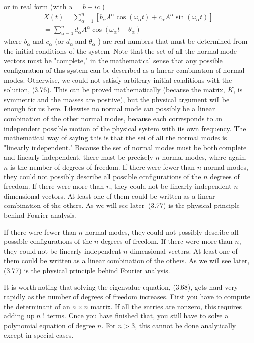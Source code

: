 \documentclass[main.tex]{subfiles}
\begin{document}
or in real form (with $w=b+i c$ )
$$
\begin{gathered}
X(t)=\sum_{\alpha=1}^n\left[b_\alpha A^\alpha \cos \left(\omega_\alpha t\right)+c_\alpha A^\alpha \sin \left(\omega_\alpha t\right)\right] \\
=\sum_{\alpha=1}^n d_\alpha A^\alpha \cos \left(\omega_\alpha t-\theta_\alpha\right)
\end{gathered}
$$
where $b_\alpha$ and $c_\alpha$ (or $d_\alpha$ and $\theta_\alpha$ ) are real numbers that must be determined from the initial conditions of the system. Note that the set of all the normal mode vectors must be "complete," in the mathematical sense that any possible configuration of this system can be described as a linear combination of normal modes. Otherwise, we could not satisfy arbitrary initial conditions with the solution, (3.76). This can be proved mathematically (because the matrix, $K$, is symmetric and the masses are positive), but the physical argument will be enough for us here. Likewise no normal mode can possibly be a linear combination of the other normal modes, because each corresponds to an independent possible motion of the physical system with its own frequency. The mathematical way of saying this is that the set of all the normal modes is "linearly independent."
Because the set of normal modes must be both complete and linearly independent, there must be precisely $n$ normal modes, where again, $n$ is the number of degrees of freedom.
If there were fewer than $n$ normal modes, they could not possibly describe all possible configurations of the $n$ degrees of freedom. If there were more than $n$, they could not be linearly independent $n$ dimensional vectors. At least one of them could be written as a linear combination of the others. As we will see later, (3.77) is the physical principle behind Fourier analysis.

If there were fewer than $n$ normal modes, they could not possibly describe all possible configurations of the $n$ degrees of freedom. If there were more than $n$, they could not be linearly independent $n$ dimensional vectors. At least one of them could be written as a linear combination of the others. As we will see later, (3.77) is the physical principle behind Fourier analysis.

It is worth noting that solving the eigenvalue equation, (3.68), gets hard very rapidly as the number of degrees of freedom increases. First you have to compute the determinant of an $n \times n$ matrix. If all the entries are nonzero, this requires adding up $n$ ! terms. Once you have finished that, you still have to solve a polynomial equation of degree $n$. For $n>3$, this cannot be done analytically except in special cases.
\end{document}
